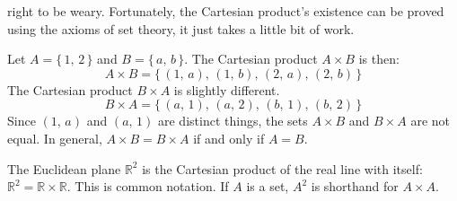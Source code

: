         right to be weary. Fortunately, the Cartesian product's existence can
        be proved using the axioms of set theory, it just takes a little bit
        of work.
        \begin{example}
            Let $A=\{\,1,\,2\,\}$ and $B=\{\,a,\,b\,\}$. The Cartesian product
            $A\times{B}$ is then:
            \begin{equation}
                A\times{B}=\{\,(1,\,a),\,(1,\,b),\,(2,\,a),\,(2,\,b)\,\}
            \end{equation}
            The Cartesian product $B\times{A}$ is slightly different.
            \begin{equation}
                B\times{A}=\{\,(a,\,1),\,(a,\,2),\,(b,\,1),\,(b,\,2)\,\}
            \end{equation}
            Since $(1,\,a)$ and $(a,\,1)$ are distinct things, the sets
            $A\times{B}$ and $B\times{A}$ are not equal. In general,
            $A\times{B}=B\times{A}$ if and only if $A=B$.
        \end{example}
        \begin{example}
            The Euclidean plane $\mathbb{R}^{2}$ is the Cartesian product of
            the real line with itself:
            $\mathbb{R}^{2}=\mathbb{R}\times\mathbb{R}$. This is common
            notation. If $A$ is a set, $A^{2}$ is shorthand for $A\times{A}$.
        \end{example}
